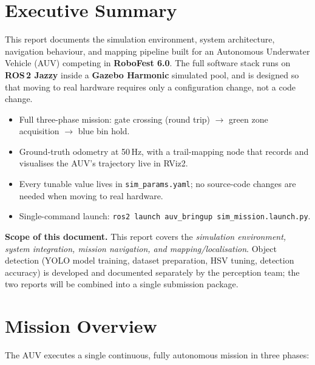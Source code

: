 \documentclass[11pt,a4paper]{article}
\newcommand{\code}[1]{\texttt{\small\color{accent}#1}}
\begin{document}
\thispagestyle{plain}
\tableofcontents
\clearpage

\section{Executive Summary}

This report documents the simulation environment, system architecture, navigation
behaviour, and mapping pipeline built for an Autonomous Underwater Vehicle (AUV)
competing in \textbf{RoboFest 6.0}. The full software stack runs on \textbf{ROS\,2 Jazzy}
inside a \textbf{Gazebo Harmonic} simulated pool, and is designed so that moving to
real hardware requires only a configuration change, not a code change.

\begin{keybox}
\begin{itemize}[noitemsep,leftmargin=1.4em]
  \item Full three-phase mission: gate crossing (round trip) $\to$ green zone
    acquisition $\to$ blue bin hold.
  \item Ground-truth odometry at 50\,Hz, with a trail-mapping node that records and
    visualises the AUV's trajectory live in RViz2.
  \item Every tunable value lives in \code{sim\_params.yaml}; no source-code changes
    are needed when moving to real hardware.
  \item Single-command launch: \code{ros2 launch auv\_bringup sim\_mission.launch.py}.
\end{itemize}
\end{keybox}

\textbf{Scope of this document.} This report covers the \emph{simulation
environment, system integration, mission navigation, and mapping/localisation}.
Object detection (YOLO model training, dataset preparation, HSV tuning,
detection accuracy) is developed and documented separately by the perception
team; the two reports will be combined into a single submission package.

\section{Mission Overview}

The AUV executes a single continuous, fully autonomous mission in three phases:
\end{document}
